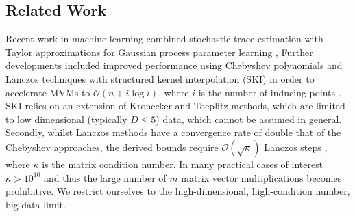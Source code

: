\documentclass[letterpaper]{article} %
\begin{document}
\subsection{Related Work}
Recent work in machine learning combined stochastic trace estimation with Taylor approximations for Gaussian process parameter learning \cite{zhang2007approximate, boutsidis2017randomized}, %
Further developments included improved performance using Chebyshev polynomials \cite{han2015large} and Lanczos techniques with structured kernel interpolation (SKI) in order to accelerate MVMs to $\mathcal{O}(n+i\log i)$, where $i$ is the number of inducing points \cite{dong2017scalable}. SKI relies on an extension of Kronecker and Toeplitz methods, which are limited to low dimensional (typically $D \leq 5$) data, which cannot be assumed in general.  Secondly, whilst Lanczos methods have a convergence rate of double that of the Chebyshev approaches, the derived bounds require $\mathcal{O}(\sqrt{\kappa})$ Lanczos steps \cite{Ubaru2016}, where $\kappa$ is the matrix condition number. In many practical cases of interest $\kappa > 10^{10}$ and thus the large number of $m$ matrix vector multiplications becomes prohibitive. 
We restrict ourselves to the high-dimensional, high-condition number, big data limit. 
\end{document}
